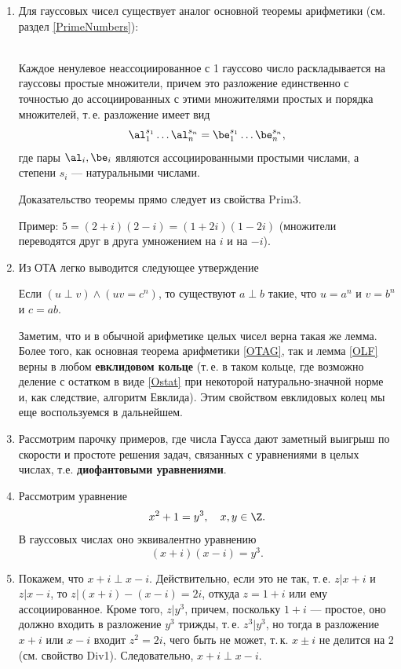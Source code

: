 \begin{enumerate}
\item Для гауссовых чисел существует аналог основной теоремы арифметики (см. раздел \ref{PrimeNumbers}):
\begin{thrm}\label{OTAG}\quad\\
Каждое ненулевое неассоциированное с 1 гауссово число раскладывается на гауссовы простые множители, причем это разложение единственно с точностью до ассоциированных с этими множителями простых и порядка множителей, т.\,е. разложение имеет вид
$$
\al_1^{s_1}\dots \al_n^{s_n}=\be_1^{s_1}\dots \be_n^{s_n},
$$
где пары $\al_i,\be_i$ являются ассоциированными простыми числами, а степени $s_i$ --- натуральными числами.
\end{thrm}
Доказательство теоремы прямо следует из свойства Prim3.

Пример: $5=(2+i)(2-i)=(1+2i)(1-2i)$ (множители переводятся друг в друга умножением на $i$ и на $-i$).





\item Из ОТА легко выводится следующее утверждение
\begin{lem}\label{OLF}
Если $(u\perp v)\land(uv=c^n)$, то существуют $a\perp b$ такие, что $u=a^n$ и $v=b^n$ и $c=ab$.
\end{lem}


Заметим, что и в обычной арифметике целых чисел верна такая же лемма. Более того, как основная теорема арифметики \ref{OTAG}, так и лемма \ref{OLF} верны в любом \textbf{евклидовом кольце} (т.\,е. в таком кольце, где возможно деление с остатком в виде \eqref{Ostat} при некоторой натурально-значной норме и, как следствие, алгоритм Евклида). Этим свойством евклидовых колец мы еще воспользуемся в дальнейшем.

\item Рассмотрим парочку примеров, где числа Гаусса дают заметный выигрыш по скорости и простоте решения задач, связанных с уравнениями в целых числах, т.е. \textbf{диофантовыми уравнениями}.
\item Рассмотрим уравнение $$x^2+1=y^3,\quad x,y\in\Z.$$
В гауссовых числах оно эквивалентно уравнению $$(x+i)(x-i)=y^3.$$

\item Покажем, что $x+i\perp x-i$. Действительно, если это не так, т.\,е. $z|x+i$ и $z|x-i$, то $z|(x+i)-(x-i)=2i$, откуда $z=1+i$ или ему ассоциированное. Кроме того, $z|y^3$, причем, поскольку $1+i$ --- простое, оно должно входить в разложение $y^3$ трижды, т.\,е. $z^3|y^3$, но тогда в разложение $x+i$ или $x-i$ входит $z^2=2i$, чего быть не может, т.\,к. $x\pm i$ не делится на 2 (см. свойство Div1). Следовательно, $x+i\perp x-i$.


\end{enumerate}
